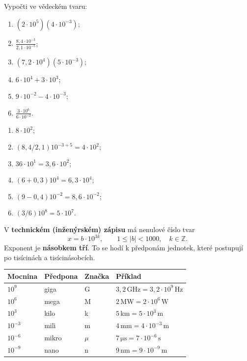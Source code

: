 \documentclass[11pt,a4paper]{article}
\begin{document}
\begin{zadaniReseniBox}[breakable=false,title={Samostatná práce 3}]
Vypočti ve vědeckém tvaru:
\begin{enumerate}[label=\alph*)]
\item $(2\cdot10^5)(4\cdot10^{-3})$;
\item $\displaystyle\frac{8{,}4\cdot10^{-3}}{2{,}1\cdot10^{-5}}$;
\item $(7{,}2\cdot10^4)(5\cdot10^{-3})$;
\item $6\cdot10^4+3\cdot10^3$;
\item $9\cdot10^{-2}-4\cdot10^{-3}$;
\item $\displaystyle\frac{3\cdot10^6}{6\cdot10^{-2}}$.
\end{enumerate}
\tcblower
\begin{enumerate}[label=\alph*)]
\item $8\cdot10^2$;
\item $(8{,}4/2{,}1)10^{-3+5}=4\cdot10^2$;
\item $36\cdot10^1=3{,}6\cdot10^2$;
\item $(6+0{,}3)10^4=6{,}3\cdot10^4$;
\item $(9-0{,}4)10^{-2}=8{,}6\cdot10^{-2}$;
\item $(3/6)10^8=5\cdot10^7$.
\end{enumerate}
\end{zadaniReseniBox}

\begin{definiceBox}[title={Definice - Technický zápis čísla}]
V \textbf{technickém (inženýrském) zápisu} má nenulové číslo tvar
\[
\boxed{x=b\cdot10^{3k},\qquad1\le|b|<1000,\quad k\in\mathbb Z.}
\]
Exponent je \textbf{násobkem tří}. To se hodí k předponám
jednotek, které postupují po tisícinách a tisícinásobcích.
\end{definiceBox}
\begin{center}\small
\begin{tabularx}{\linewidth}{@{}>{\raggedright\arraybackslash}p{19mm}>{\raggedright\arraybackslash}p{18mm}>{\raggedright\arraybackslash}p{23mm}X@{}}
\toprule
Mocnina & Předpona & Značka & Příklad\\\midrule
$10^9$ & giga & G & $3{,}2\,\mathrm{GHz}=3{,}2\cdot10^9\,\mathrm{Hz}$\\
$10^6$ & mega & M & $2\,\mathrm{MW}=2\cdot10^6\,\mathrm W$\\
$10^3$ & kilo & k & $5\,\mathrm{km}=5\cdot10^3\,\mathrm m$\\
$10^{-3}$ & mili & m & $4\,\mathrm{mm}=4\cdot10^{-3}\,\mathrm m$\\
$10^{-6}$ & mikro & $\mu$ & $7\,\mathrm{\mu s}=7\cdot10^{-6}\,\mathrm s$\\
$10^{-9}$ & nano & n & $9\,\mathrm{nm}=9\cdot10^{-9}\,\mathrm m$\\
\bottomrule
\end{tabularx}
\end{center}
\end{document}
